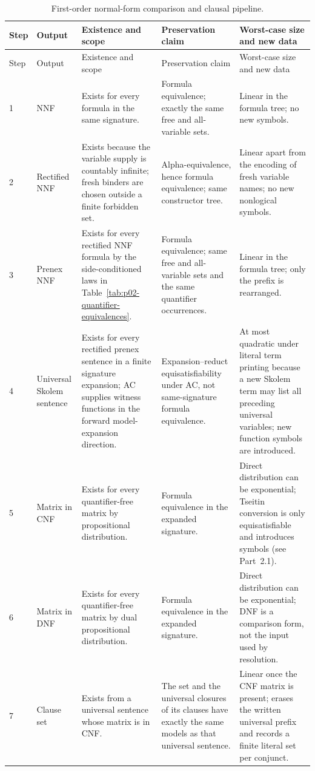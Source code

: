 \begin{landscape}
\begingroup\scriptsize\setlength{\tabcolsep}{3pt}
\begin{longtable}{@{}p{.30in}p{1.05in}p{1.65in}p{1.90in}p{2.00in}@{}}
\caption{First-order normal-form comparison and clausal pipeline.}
\label{tab:p02-fol-normal-form-pipeline}\\
\toprule
Step & Output & Existence and scope & Preservation claim & Worst-case size and new data \\ \midrule
\endfirsthead
\toprule Step & Output & Existence and scope & Preservation claim & Worst-case size and new data \\ \midrule
\endhead
1 & NNF & Exists for every formula in the same signature. & Formula
equivalence; exactly the same free and all-variable sets. & Linear in the
formula tree; no new symbols. \\
2 & Rectified NNF & Exists because the variable supply is countably infinite;
fresh binders are chosen outside a finite forbidden set. & Alpha-equivalence,
hence formula equivalence; same constructor tree. & Linear apart from the
encoding of fresh variable names; no new nonlogical symbols. \\
3 & Prenex NNF & Exists for every rectified NNF formula by the side-conditioned
laws in Table~\ref{tab:p02-quantifier-equivalences}. & Formula equivalence;
same free and all-variable sets and the same quantifier occurrences. & Linear
in the formula tree; only the prefix is rearranged. \\
4 & Universal Skolem sentence & Exists for every rectified prenex sentence in a
finite signature expansion; AC supplies witness functions in the forward
model-expansion direction. & Expansion--reduct equisatisfiability under AC,
not same-signature formula equivalence. & At most quadratic under literal term
printing because a new Skolem term may list all preceding universal variables;
new function symbols are introduced. \\
5 & Matrix in CNF & Exists for every quantifier-free matrix by propositional
distribution. & Formula equivalence in the expanded signature. & Direct
distribution can be exponential; Tseitin conversion is only equisatisfiable
and introduces symbols (see Part~2.1). \\
6 & Matrix in DNF & Exists for every quantifier-free matrix by dual
propositional distribution. & Formula equivalence in the expanded signature. &
Direct distribution can be exponential; DNF is a comparison form, not the
input used by resolution. \\
7 & Clause set & Exists from a universal sentence whose matrix is in CNF. & The
set and the universal closures of its clauses have exactly the same models as
that universal sentence. & Linear once the CNF matrix is present; erases the
written universal prefix and records a finite literal set per conjunct. \\
\bottomrule
\end{longtable}
\endgroup
\end{landscape}

